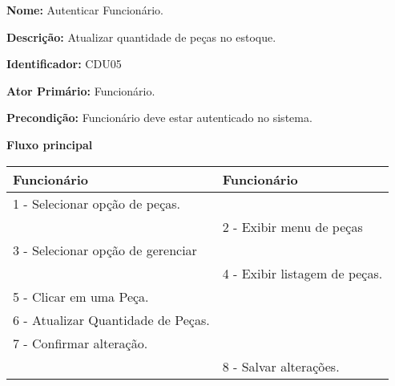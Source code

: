\par
\textbf{Nome:} Autenticar Funcionário.
\par
\textbf{Descrição:}  Atualizar quantidade de peças no estoque.	
\par 
\textbf{Identificador:} CDU05
\par
\textbf{Ator Primário:} Funcionário.	
\par
\textbf{Precondição:} Funcionário deve estar autenticado no sistema.
\par
\par
\textbf{Fluxo principal}\par
\begin{tabular}{|p{7cm}|p{7cm}|}
	\hline 
	
	
	Funcionário
	& 
	
	Funcionário
	\\ 
	\hline 
	
	
	1 - Selecionar opção de peças.
	&  \\ 
	\hline 
	& 
	
	2 - Exibir menu de peças
	\\ 
	\hline 
	
	
	3 - Selecionar opção de gerenciar
	&  \\ 
	\hline 
	& 
	
	4 - Exibir listagem de peças.
	\\ 
	\hline 
	
	
	5 - Clicar em uma Peça.
	&  \\ 
	\hline 
	
	
	6 - Atualizar Quantidade de Peças.
	&  \\ 
	\hline 
	
	
	7 - Confirmar alteração.
	&  \\ 
	\hline 
	& 
	
	8 - Salvar alterações.
	\\ 
	\hline 
\end{tabular} 
\vspace{12px}